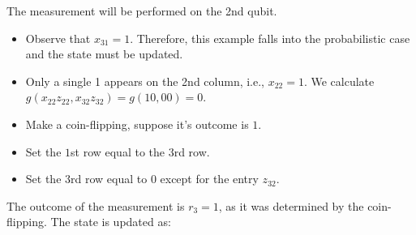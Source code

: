 \begin{example}
	The measurement will be performed on the 2nd qubit.
	
	
	
	
	
	
	\begin{itemize}
		\item Observe that $x_{31}=1$. Therefore, this example falls into the probabilistic case and the state must be updated.
		\item Only a single 1 appears on the 2nd column, i.e.,  $x_{22}=1$. We calculate $g(x_{22}z_{22},x_{32}z_{32})= g(1 0,0 0 )=0 $.
		\item Make a coin-flipping, suppose it's outcome is $1$.
		\item Set the $1$st row equal to the $3$rd row.
		\item Set the $3$rd row equal to $0$ except for the entry $z_{32}$. 
		
	\end{itemize}
	
	The outcome of the measurement is $r_3=1$, as it was determined by the coin-flipping. The state is updated as:
	

\end{example}
